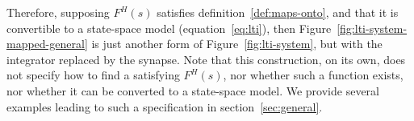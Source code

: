 \documentclass[12pt]{article}
\theoremstyle{definition}
\begin{document}
Therefore, supposing $F^{H}(s)$ satisfies definition~\ref{def:maps-onto}, and that it is convertible to a state-space model (equation~\ref{eq:lti}), then Figure~\ref{fig:lti-system-mapped-general} is just another form of Figure~\ref{fig:lti-system}, but with the integrator replaced by the synapse.
Note that this construction, on its own, does not specify how to find a satisfying $F^{H}(s)$, nor whether such a function exists, nor whether it can be converted to a state-space model.
We provide several examples leading to such a specification in section~\ref{sec:general}.
\end{document}
